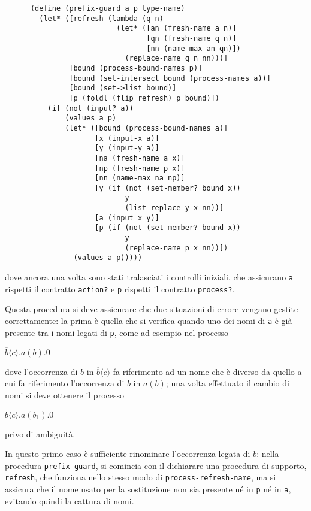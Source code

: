 \begin{lstlisting}
      (define (prefix-guard a p type-name)
        (let* ([refresh (lambda (q n)
                          (let* ([an (fresh-name a n)]
                                 [qn (fresh-name q n)]
                                 [nn (name-max an qn)])
                            (replace-name q n nn)))]
               [bound (process-bound-names p)]
               [bound (set-intersect bound (process-names a))]
               [bound (set->list bound)]
               [p (foldl (flip refresh) p bound)])
          (if (not (input? a))
              (values a p)
              (let* ([bound (process-bound-names a)]
                     [x (input-x a)]
                     [y (input-y a)]
                     [na (fresh-name a x)]
                     [np (fresh-name p x)]
                     [nn (name-max na np)]
                     [y (if (not (set-member? bound x))
                            y
                            (list-replace y x nn))]
                     [a (input x y)]
                     [p (if (not (set-member? bound x))
                            y
                            (replace-name p x nn))])
                (values a p)))))
\end{lstlisting}

dove ancora una volta sono stati tralasciati i controlli iniziali, che
assicurano \lstinline{a} rispetti il contratto \lstinline{action?} e
\lstinline{p} rispetti il contratto \lstinline{process?}.

Questa procedura si deve assicurare che due situazioni di errore vengano
gestite correttamente: la prima \`e quella che si verifica quando uno dei
nomi di \lstinline{a} \`e gi\`a presente tra i nomi legati di
\lstinline{p}, come ad esempio nel processo

\begin{pilisting}
$
    \overline{b}\langle c\rangle.a(b).0
$
\end{pilisting}

dove l'occorrenza di $b$ in $\overline{b}\langle c\rangle$ fa riferimento
ad un nome che \`e diverso da quello a cui fa riferimento l'occorrenza di
$b$ in $a(b)$; una volta effettuato il cambio di nomi si deve ottenere il
processo

\begin{pilisting}
$
    \overline{b}\langle c\rangle.a(b_1).0
$
\end{pilisting}

privo di ambiguit\`a.

In questo primo caso \`e sufficiente rinominare l'occorrenza legata di $b$:
nella procedura \lstinline{prefix-guard}, si comincia con il dichiarare una
procedura di supporto, \lstinline{refresh}, che funziona nello stesso modo
di \lstinline{process-refresh-name}, ma si assicura che il nome usato per
la sostituzione non sia presente n\'e in \lstinline{p} n\'e in
\lstinline{a}, evitando quindi la cattura di nomi.

